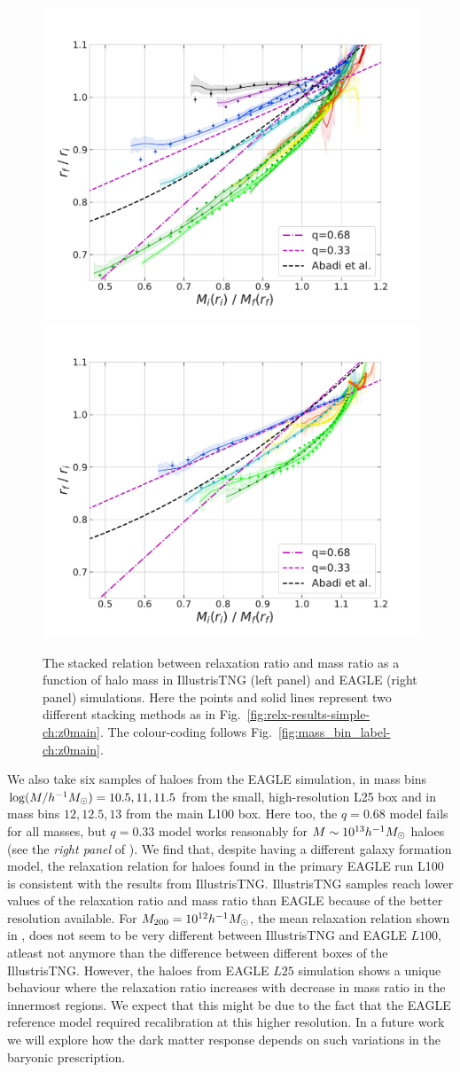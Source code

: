 \begin{figure}
\centering
\includegraphics[width=0.49\linewidth]{plots/fit_view_M_T.pdf}
\includegraphics[width=0.49\linewidth]{plots/fit_view_M_E.pdf}
\caption{The stacked relation between relaxation ratio and mass ratio as a function of halo mass in IllustrisTNG (left panel) and EAGLE (right panel) simulations. Here the points and solid lines represent two different stacking methods as in Fig.~\ref{fig:relx-results-simple-ch:z0main}. The colour-coding follows Fig.~\ref{fig:mass_bin_label-ch:z0main}.} 
\label{fig:fit-view-mass-indep-ch:z0main}
\end{figure}








We also take six samples of haloes from the EAGLE simulation, in mass bins $\log (M/h^{-1}M_{\odot}) = 10.5, 11,11.5$  from the small, high-resolution L25 box and in mass bins $12, 12.5, 13$ from the main L100 box. Here too, the $q=0.68$ model fails for all masses, but $q=0.33$ model works reasonably for  $M\sim10^{13} h^{-1}M_{\odot}$ haloes (see the \emph{right panel} of ). We find that, despite having a different galaxy formation model, the relaxation relation for haloes found in the primary EAGLE run L100 is consistent with the results from IllustrisTNG. 
IllustrisTNG samples reach lower values of the relaxation ratio and mass ratio than EAGLE because of the better resolution available. For $M_{200}=10^{12} h^{-1}M_{\odot}$, the mean relaxation relation shown in , does not seem to be very different between IllustrisTNG and EAGLE $L100$, atleast not anymore than the difference between different boxes of the IllustrisTNG. However, the haloes from EAGLE $L25$ simulation shows a unique behaviour where the relaxation ratio increases with decrease in mass ratio in the innermost regions. We expect that this might be due to the fact that the EAGLE reference model required recalibration at this higher resolution. In a future work we will explore how the dark matter response depends on such variations in the baryonic prescription.


